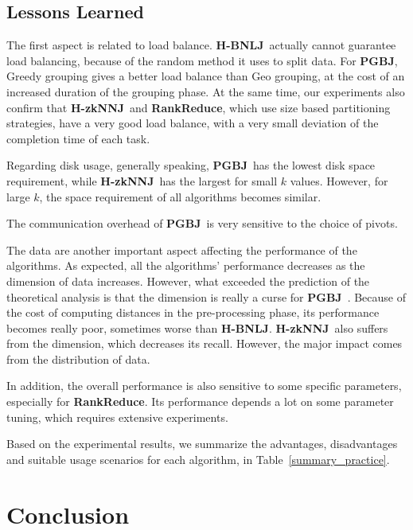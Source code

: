 \documentclass[10pt,journal,compsoc]{IEEEtran}
\newcommand{\TODO}[1]{\textcolor{red}{\textbf{[TODO:#1]}}}
\newcommand{\Z}{{\bf H-zkNNJ}}
\newcommand{\LSH}{{\bf RankReduce}}
\newcommand{\VO}{{\bf PGBJ}}
\newcommand{\HBNLJ}{{\bf H-BNLJ}}
\begin{document}
\subsection{Lessons Learned}

The first aspect is related to load balance. \HBNLJ~actually cannot guarantee load balancing, because of the random 
method it uses to split data. For \VO, Greedy grouping gives a better load balance than Geo grouping, at 
the cost of an increased duration of the grouping phase. At 
the same time, our experiments also confirm that \Z~and \LSH, which use size based 
partitioning strategies, have a very good load balance, with a very small deviation of the completion time of each 
task. %

Regarding disk usage, generally speaking, \VO~has the lowest disk space requirement, while \Z~has the largest for small
$k$ values. However, for large $k$, the space requirement of all algorithms becomes similar. 

The communication overhead of \VO~is very sensitive to the choice of pivots. 

The data are another important aspect affecting the performance of the algorithms. As expected, all the 
algorithms' performance decreases as the dimension of data increases. However, what exceeded the prediction of the 
theoretical analysis is that the dimension is really a curse for \VO~. Because of the cost of computing distances in 
the pre-processing phase, its performance becomes really poor, sometimes worse than \HBNLJ. \Z~also suffers from the 
dimension, which decreases its recall. However, the major impact comes from the distribution of data. 

In addition, the overall performance is also sensitive to some specific parameters, especially for \LSH. Its 
performance depends a lot on some parameter tuning, which requires extensive experiments.

Based on the experimental results, we summarize the advantages, disadvantages and suitable usage scenarios for each 
algorithm, in Table~\ref{summary_practice}.

%
\section{Conclusion}
\end{document}

